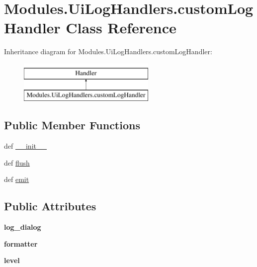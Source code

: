 \hypertarget{classModules_1_1UiLogHandlers_1_1customLogHandler}{\section{Modules.\-Ui\-Log\-Handlers.\-custom\-Log\-Handler Class Reference}
\label{classModules_1_1UiLogHandlers_1_1customLogHandler}
}
Inheritance diagram for Modules.\-Ui\-Log\-Handlers.\-custom\-Log\-Handler\-:\begin{figure}[H]
\begin{center}
\leavevmode
\includegraphics[height=2.000000cm]{classModules_1_1UiLogHandlers_1_1customLogHandler}
\end{center}
\end{figure}
\subsection*{Public Member Functions}
\begin{DoxyCompactItemize}
\item 
def \hyperlink{classModules_1_1UiLogHandlers_1_1customLogHandler_a516257c4da93f2937b47b38175e0fb0a}{\-\_\-\-\_\-init\-\_\-\-\_\-}
\item 
def \hyperlink{classModules_1_1UiLogHandlers_1_1customLogHandler_a333736c77b55367a1cbdc3150495bd87}{flush}
\item 
def \hyperlink{classModules_1_1UiLogHandlers_1_1customLogHandler_a9d276c9ecd8c566ad0bc10d5c516b793}{emit}
\end{DoxyCompactItemize}
\subsection*{Public Attributes}
\begin{DoxyCompactItemize}
\item 
\hypertarget{classModules_1_1UiLogHandlers_1_1customLogHandler_ab27011149cb953ba96d20bf97f9386dd}{{\bfseries log\-\_\-dialog}}\label{classModules_1_1UiLogHandlers_1_1customLogHandler_ab27011149cb953ba96d20bf97f9386dd}

\item 
\hypertarget{classModules_1_1UiLogHandlers_1_1customLogHandler_a6a5f60d2b7d13fe2381ce8bb101f1cda}{{\bfseries formatter}}\label{classModules_1_1UiLogHandlers_1_1customLogHandler_a6a5f60d2b7d13fe2381ce8bb101f1cda}

\item 
\hypertarget{classModules_1_1UiLogHandlers_1_1customLogHandler_a7d601145580a3a6daf9acbfcc2e5646a}{{\bfseries level}}\label{classModules_1_1UiLogHandlers_1_1customLogHandler_a7d601145580a3a6daf9acbfcc2e5646a}

\end{DoxyCompactItemize}



